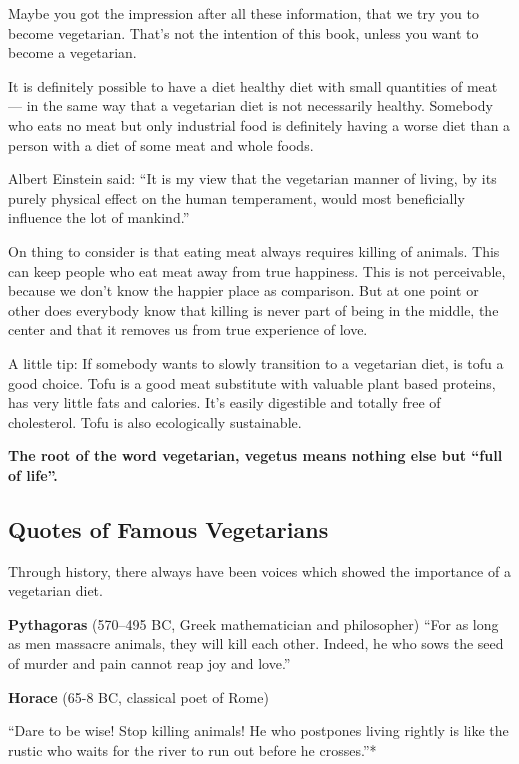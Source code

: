 \documentclass[../main.tex]{subfiles}
\begin{document}
Maybe you got the impression after all these information, that we try you to become vegetarian.
That's not the intention of this book, unless you want to become a vegetarian.

It is definitely possible to have a diet healthy diet with small quantities of meat --- in the same way that a vegetarian diet is not necessarily healthy.
Somebody who eats no meat but only industrial food is definitely having a worse diet than a person with a diet of some meat and whole foods.

Albert Einstein said:
``It is my view that the vegetarian manner of living, by its purely physical effect on the human temperament, would most beneficially influence the lot of mankind.''

On thing to consider is that eating meat always requires killing of animals.
This can keep people who eat meat away from true happiness.
This is not perceivable, because we don't know the happier place as comparison.
But at one point or other does everybody know that killing is never part of being in the middle, the center and that it
removes us from true experience of love.

A little tip: If somebody wants to slowly transition to a vegetarian diet, is tofu a good choice.
Tofu is a good meat substitute with valuable plant based proteins, has very little fats and calories.
It's easily digestible and totally free of cholesterol.
Tofu is also ecologically sustainable.

\textbf{The root of the word vegetarian, vegetus means nothing else but ``full of life''.}

\subsection{Quotes of Famous Vegetarians}

Through history, there always have been voices which showed the importance of a vegetarian diet.


\vspace{5mm}
\noindent \textbf{Pythagoras} (570--495 BC, Greek mathematician and philosopher)
  ``For as long as men massacre animals, they will kill each other. Indeed, he who sows the seed of murder and pain cannot reap joy and love.''

\vspace{5mm}
\noindent \textbf{Horace} (65-8 BC, classical poet of Rome)

\noindent ``Dare to be wise! Stop killing animals!
He who postpones living rightly is like the rustic who waits for the river to run out before he crosses.''*
\end{document}
